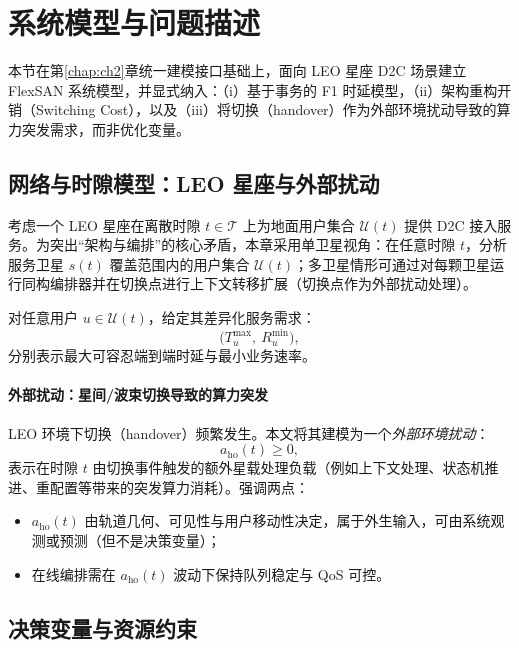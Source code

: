 \documentclass[type=master]{fduthesis}
\begin{document}
\section{系统模型与问题描述}
\label{sec:ch3_model}

本节在第\ref{chap:ch2}章统一建模接口基础上，面向 LEO 星座 D2C 场景建立 FlexSAN 系统模型，并显式纳入：（i）基于事务的 F1 时延模型，（ii）架构重构开销（Switching Cost），以及（iii）将切换（handover）作为外部环境扰动导致的算力突发需求，而非优化变量。

\subsection{网络与时隙模型：LEO 星座与外部扰动}
\label{subsec:ch3_network_model}

考虑一个 LEO 星座在离散时隙 $t\in\mathcal{T}$ 上为地面用户集合 $\mathcal{U}(t)$ 提供 D2C 接入服务。为突出“架构与编排”的核心矛盾，本章采用单卫星视角：在任意时隙 $t$，分析服务卫星 $s(t)$ 覆盖范围内的用户集合 $\mathcal{U}(t)$；多卫星情形可通过对每颗卫星运行同构编排器并在切换点进行上下文转移扩展（切换点作为外部扰动处理）。

对任意用户 $u\in\mathcal{U}(t)$，给定其差异化服务需求：
\begin{equation}
\Big(T_u^{\max},\ R_u^{\min}\Big),
\end{equation}
分别表示最大可容忍端到端时延与最小业务速率。

\paragraph{外部扰动：星间/波束切换导致的算力突发}
LEO 环境下切换（handover）频繁发生。本文将其建模为一个\emph{外部环境扰动}：
\begin{equation}
a_{\mathrm{ho}}(t)\ge 0,
\end{equation}
表示在时隙 $t$ 由切换事件触发的额外星载处理负载（例如上下文处理、状态机推进、重配置等带来的突发算力消耗）。强调两点：
\begin{itemize}
  \item $a_{\mathrm{ho}}(t)$ 由轨道几何、可见性与用户移动性决定，属于外生输入，可由系统观测或预测（但不是决策变量）；
  \item 在线编排需在 $a_{\mathrm{ho}}(t)$ 波动下保持队列稳定与 QoS 可控。
\end{itemize}

\subsection{决策变量与资源约束}
\label{subsec:ch3_decision_variables}
\end{document}
